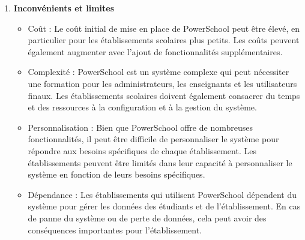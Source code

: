 \begin{enumerate}
\begin{itemize}
        \end{itemize}
    \newpage
    \item \textbf{Inconvénients et limites}
        \begin{itemize}
            \item Coût : Le coût initial de mise en place de PowerSchool peut être élevé, en particulier pour les établissements scolaires plus petits. Les coûts peuvent également augmenter avec l'ajout de fonctionnalités supplémentaires.
            \item Complexité : PowerSchool est un système complexe qui peut nécessiter une formation pour les administrateurs, les enseignants et les utilisateurs finaux. Les établissements scolaires doivent également consacrer du temps et des ressources à la configuration et à la gestion du système.
            \item Personnalisation : Bien que PowerSchool offre de nombreuses fonctionnalités, il peut être difficile de personnaliser le système pour répondre aux besoins spécifiques de chaque établissement. Les établissements peuvent être limités dans leur capacité à personnaliser le système en fonction de leurs besoins spécifiques.
            \item Dépendance : Les établissements qui utilisent PowerSchool dépendent du système pour gérer les données des étudiants et de l'établissement. En cas de panne du système ou de perte de données, cela peut avoir des conséquences importantes pour l'établissement.
        \end{itemize}
\end{enumerate}